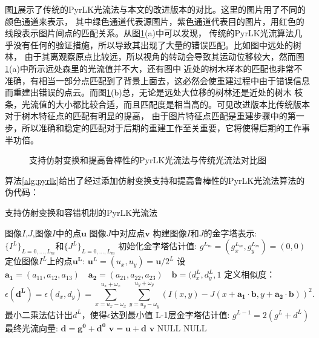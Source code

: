 图\ref{fig:pyrlk}展示了传统的PyrLK光流法与本文的改进版本的对比。这里的图片用了不同的颜色通道来表示，
其中绿色通道代表源图片，紫色通道代表目的图片，用红色的线段表示图片间点的匹配关系。从图\ref{fig:pyrlk}(a)中可以发现，
传统的PyrLK光流算法几乎没有任何的验证措施，所以导致其出现了大量的错误匹配。比如图中远处的树林，
由于其离观察原点比较远，所以视角的转动会导致其运动位移较大，然而图\ref{fig:pyrlk}(a)中所示远处森里的光流值并不大，还有图中
近处的树木样本的匹配也非常不准确，有相当一部分点匹配到了背景上面去，这必然会使重建过程中由于错误信息
而重建出错误的点云。而图\ref{fig:pyrlk}(b)总，无论是远处大位移的树林还是近处的树木
枝条，光流值的大小都比较合适，而且匹配度是相当高的。可见改进版本比传统版本对于树木特征点的匹配有明显的提高，
由于图片特征点匹配是重建步骤中的第一步，所以准确和稳定的匹配对于后期的重建工作至关重要，它将使得后期的工作事半功倍。
\begin{figure}[H]
	\centering
	\hspace{4em}
	\caption{支持仿射变换和提高鲁棒性的PyrLK光流法与传统光流法对比图}
	\label{fig:pyrlk}
\end{figure}


\clearpage
算法\ref{alg:pyrlk}给出了经过添加仿射变换支持和提高鲁棒性的PyrLK光流法算法的伪代码：\\
\begin{algorithm}[H]
	\caption{支持仿射变换和容错机制的PyrLK光流法}
	\label{alg:pyrlk}
	\begin{algorithmic}[1]
		\Require 图像$I$,$J$,图像$I$中的点$\mathbf{u}$
		\Ensure 图像$J$中对应点$\mathbf{v}$
		\State 构建图像$I$和$J$的金字塔表示: $\{I^L\}_{L=0,...,L_m}$和$\{J^L\}_{L=0,...,L_m}$
		\State 初始化金字塔估计值: $g^{L_{m}}=(g_x^{L_m}, g_y^{L_m})=(0,0)$
		\State 定位图像$I^L$上的点$\mathbf{u^L}$: $\mathbf{u}^L=(u_x,u_y)=\mathbf{u}/2^L$
		\State 设$\mathbf{a_1}=(a_{11},a_{12},a_{13})\quad \mathbf{a_2}=(a_{21},a_{22},a_{23})\quad 
				\mathbf{b}=(d_x^L, d_y^L, 1$
		\State 定义相似度：
				\[ \epsilon(\mathbf{d^L})=\epsilon(d_x,d_y)=\sum_{x=u_x-\omega_x}^{u_x+\omega_x}\sum_{y=u_y-\omega_y}
				^{u_y+\omega_y}(I(x,y) - J(x+\mathbf{a_1}\cdot \mathbf{b},y+\mathbf{a_2}\cdot \mathbf{b}))^2.\]
				\State 最小二乘法估计出$d^L$，使得$\epsilon $达到最小值
		\State L-1层金字塔估计值: $g^{L-1}=2(g^L+d^L)$
		\EndFor
		\State 最终光流向量: $\mathbf{d}=\mathbf{g^0}+\mathbf{d^0}$
		\State $\mathbf{v}=\mathbf{u+d}$
				\State \Return $\mathbf{v}$
			\Else
				\State \Return NULL
			\EndIf
		\Else
			\State \Return NULL
		\EndIf
	\end{algorithmic}
\end{algorithm}

